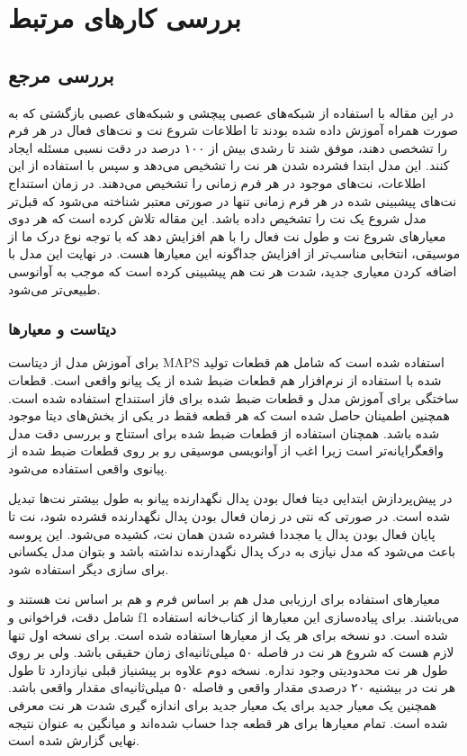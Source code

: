 \chapter{بررسی کارهای مرتبط}
\section{بررسی مرجع \cite{hawthorne2017onsets}}
در این مقاله با استفاده از شبکه‌های عصبی پیچشی و شبکه‌های عصبی بازگشتی که به صورت
همراه آموزش داده شده بودند تا اطلاعات شروع نت و نت‌های فعال در هر فرم را تشخصی
دهند، موفق شند تا رشدی بیش از ۱۰۰ درصد در دقت نسبی مسئله ایجاد کنند. این مدل
ابتدا فشرده شدن هر نت را تشخیص می‌دهد و سپس با استفاده از این اطلاعات، نت‌های
موجود در هر فرم زمانی را تشخیص می‌دهند. در زمان استنداج نت‌های پیشبینی شده در هر
فرم زمانی تنها در صورتی معتبر شناخته می‌شود که قبل‌تر مدل شروع یک نت را تشخیص
داده باشد. این مقاله تلاش کرده است که هر دوی معیارهای شروع نت و طول نت فعال را
با هم افزایش دهد که با توجه نوع درک ما از موسیقی، انتخابی مناسب‌تر از افزایش
جداگونه این معیارها هست. در نهایت این مدل با اضافه کردن معیاری جدید، شدت هر نت
هم پیشبینی کرده است که موجب به آوانوسی طبیعی‌تر می‌شود.

\subsection{دیتاست و معیارها}
برای آموزش مدل از دیتاست
MAPS
استفاده شده است که شامل هم قطعات تولید شده با استفاده از نرم‌افزار هم قطعات ضبط
شده از یک پیانو واقعی است. قطعات ساختگی برای آموزش مدل و قطعات ضبط شده برای فاز
استنداج استفاده شده است. همچنین اطمینان حاصل شده است که هر قطعه فقط در یکی از
بخش‌های دیتا موجود شده باشد. همچنان استفاده از قطعات ضبط شده برای استناج و بررسی
دقت مدل واقعگرایانه‌تر است زیرا اغب از آوانویسی موسیقی رو بر روی قطعات ضبط شده
از پیانوی واقعی استفاده می‌شود.

در پیش‌پردازش ابتدایی دیتا فعال بودن پدال نگهدارنده پیانو به طول بیشتر نت‌ها
تبدیل شده است. در صورتی که نتی در زمان فعال بودن پدال نگهدارنده فشرده شود، نت
تا پایان فعال بودن پدال یا مجددا فشرده شدن همان نت، کشیده می‌شود. این پروسه
باعث می‌شود که مدل نیازی به درک پدال نگهدارنده نداشته باشد و بتوان مدل یکسانی
برای سازی دیگر استفاده شود.

معیارهای استفاده برای ارزیابی مدل هم بر اساس فرم و هم بر اساس نت هستند و شامل
دقت، فراخوانی و 
f1
می‌باشند. برای پیاده‌سازی این معیارها از کتاب‌خانه
 \cite{raffel2014mir_eval}
استفاده شده است. دو نسخه برای هر یک از معیارها استفاده شده است. برای نسخه اول
تنها لازم هست که شروع هر نت در فاصله ۵۰ میلی‌ثانیه‌ای زمان حقیقی باشد. ولی بر روی
طول هر نت محدودیتی وجود نداره. نسخه دوم علاوه بر پیشنیاز قبلی نیازدارد تا طول هر
نت در بیشنیه ۲۰ درصدی مقدار واقعی و فاصله ۵۰ میلی‌ثانیه‌ای مقدار واقعی باشد.
همچنین یک معیار جدید برای یک معیار جدید برای اندازه گیری شدت هر نت معرفی شده
است. تمام معیارها برای هر قطعه جدا حساب شده‌اند و میانگین به عنوان نتیجه نهایی
گزارش شده است.

